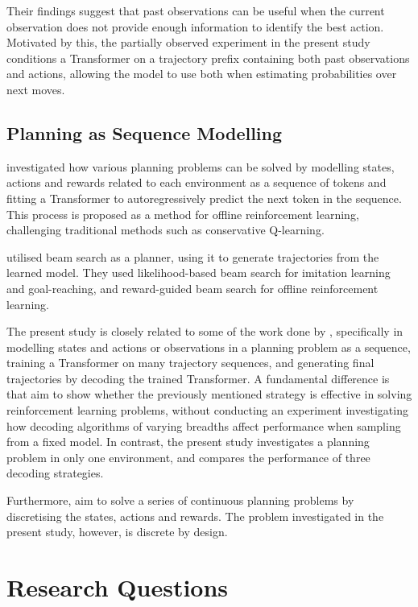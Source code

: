 ﻿\documentclass[12pt,a4paper]{article}
\theoremstyle{definition}
\begin{document}
Their findings suggest that past observations can be useful when the current observation
does not provide enough information to identify the best action. Motivated by this, the
partially observed experiment in the present study conditions a Transformer on a trajectory
prefix containing both past observations and actions, allowing the model to use both when
estimating probabilities over next moves.

\subsection{Planning as Sequence Modelling}

\citet{janner2021trajectory} investigated how various planning problems
can be solved by modelling states, actions and rewards related to each environment
as a sequence of tokens and fitting a Transformer to autoregressively predict
the next token in the sequence. This process is proposed as a method for
offline reinforcement learning, challenging traditional methods such as
conservative Q-learning.

\citet{janner2021trajectory} utilised beam search as a planner, using it to generate trajectories from the
learned model. They used likelihood-based beam search for imitation learning and goal-reaching,
and reward-guided beam search for offline reinforcement learning.

The present study is closely related to some of the work done by \citet{janner2021trajectory},
specifically in modelling states and actions or observations in a planning problem as a sequence,
training a Transformer on many trajectory sequences, and generating final trajectories by
decoding the trained Transformer. A fundamental difference is that
\citet{janner2021trajectory} aim to show whether the previously mentioned strategy is effective in solving reinforcement learning
problems, without conducting an experiment investigating how decoding algorithms of varying breadths
affect performance when sampling from a fixed model. In contrast, the present study
investigates a planning problem in only one environment, and compares the performance of three decoding strategies.

Furthermore, \citet{janner2021trajectory} aim to solve a series of continuous planning problems by discretising the states, actions and rewards.
The problem investigated in the present study, however, is discrete by design.


\section{Research Questions}
\end{document}
